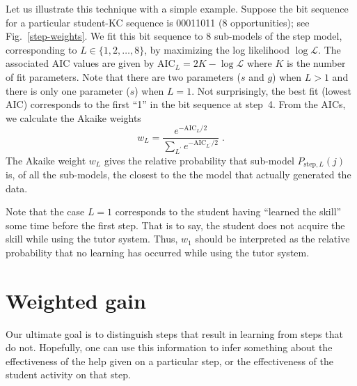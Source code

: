 \documentclass{acmlarge-edm}
\begin{document}
Let us illustrate this technique with a simple example.  Suppose the
bit sequence for a particular student-KC sequence is 00011011 (8
opportunities); see Fig.~\ref{step-weights}.  We fit this bit sequence to 8
sub-models of the step model, corresponding to $L\in\{1,2,\ldots,8\}$,
by maximizing the log likelihood $\log\mathcal{L}$.  The associated
AIC values are given by $\mathrm{AIC}_L=2 K-\log \mathcal{L}$ where
$K$ is the number of fit parameters.  Note that there are two
parameters ($s$ and $g$) when $L>1$ and there is only one parameter
($s$) when $L=1$.
%
%
Not surprisingly, the best fit (lowest AIC) corresponds to the first
``1'' in the bit sequence at step~4.  From the AICs, we calculate 
the Akaike weights
%
\begin{equation}
     w_L=\frac{e^{-\mathrm{AIC}_L/2} }{\sum_{L^\prime}
       e^{-\mathrm{AIC}_{L^\prime}/2}} \; .
\end{equation}
%
The Akaike weight $w_L$ gives the relative probability that sub-model 
$P_{\mathrm{step},L}(j)$ is, of all the sub-models, the closest to the 
the model that actually generated the data.


Note that the case $L=1$ corresponds to the student having 
``learned the skill'' some time before the first step.  That is to say, 
the student does not acquire the skill while using the tutor system.
Thus, $w_1$ should be interpreted as the relative probability
that no learning has occurred while using the tutor system.

\section{Weighted gain}

Our ultimate goal is to distinguish steps that result in 
learning from steps that do not.  Hopefully, one can use this
information to infer something about the effectiveness of the help
given on a particular step, or the effectiveness of
the student activity on that step.
\end{document}
